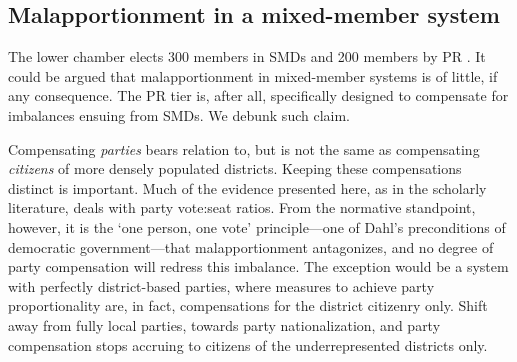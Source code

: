 \documentclass[letter,12pt]{article}
\begin{document}

\subsection{Malapportionment in a mixed-member system}

\noindent The lower chamber elects 300 members in SMDs and 200 members by PR \citep{weldonMixedMemberSys2001}. It could be argued that malapportionment in mixed-member systems is of little, if any consequence. The PR tier is, after all, specifically designed to compensate for imbalances ensuing from SMDs. We debunk such claim. 


Compensating \emph{parties} bears relation to, but is not the same as compensating \emph{citizens} of more densely populated districts. Keeping these compensations distinct is important. Much of the evidence presented here, as in the scholarly literature, deals with party vote:seat ratios. From the normative standpoint, however, it is the `one person, one vote' principle---one of Dahl's \citeyearpar{dahl.1972} preconditions of democratic government---that malapportionment antagonizes, and no degree of party compensation will redress this imbalance. The exception would be a system with perfectly district-based parties, where measures to achieve party proportionality are, in fact, compensations for the district citizenry only. Shift away from fully local parties, towards party nationalization, and party compensation stops accruing to citizens of the underrepresented districts only. 

\end{document}
